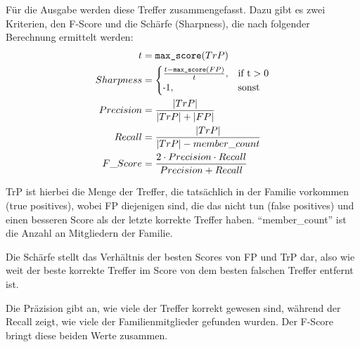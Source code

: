\begin{enumerate}[a)]
                Für die Ausgabe werden diese Treffer zusammengefasst. Dazu gibt es zwei Kriterien, den F-Score und die Schärfe (Sharpness), die nach folgender Berechnung ermittelt werden:
                \begin{equation}
                    \label{equ:f_score}
                    \begin{split}
                        t & = \texttt{max\_score}(TrP)\\
                        Sharpness & = \begin{cases}
                                          \frac{t-\texttt{max\_score}(FP)}{t},& \text{if t} > 0\\
                                          \sminus 1,& \text{sonst}
                                      \end{cases}\\
                        Precision & = \frac{|TrP|}{|TrP|+|FP|}\\
                        Recall & = \frac{|TrP|}{|TrP|-member\_count}\\
                        F\_Score & = \frac{2 \cdot Precision \cdot Recall}{Precision + Recall}
                    \end{split}
                \end{equation}

                TrP ist hierbei die Menge der Treffer, die tatsächlich in der Familie vorkommen (true positives), wobei FP diejenigen sind, die das nicht tun (false positives) und einen besseren Score als der letzte korrekte Treffer haben. ``member\_count'' ist die Anzahl an Mitgliedern der Familie.

                Die Schärfe stellt das Verhältnis der besten Scores von FP und TrP dar, also wie weit der beste korrekte Treffer im Score von dem besten falschen Treffer entfernt ist.

                Die Präzision gibt an, wie viele der Treffer korrekt gewesen sind, während der Recall zeigt, wie viele der Familienmitglieder gefunden wurden. Der F-Score bringt diese beiden Werte zusammen.


\end{enumerate}
